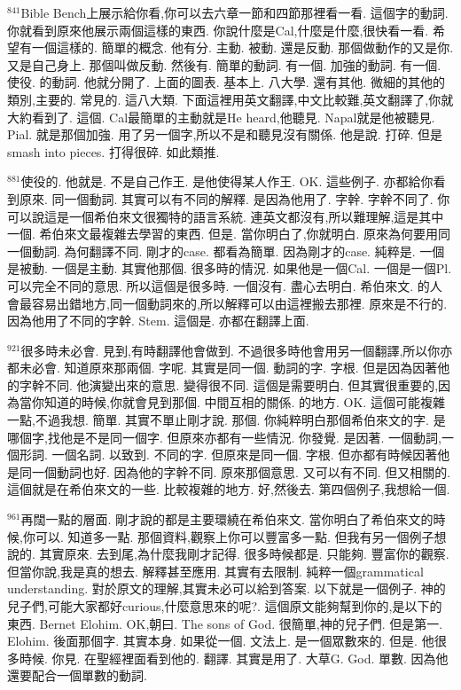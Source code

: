 \documentclass{book}
\begin{document}
$^{841}$Bible Bench上展示給你看,你可以去六章一節和四節那裡看一看.
這個字的動詞.
你就看到原來他展示兩個這樣的東西.
你說什麼是Cal,什麼是什麼,很快看一看.
希望有一個這樣的.
簡單的概念.
他有分.
主動.
被動.
還是反動.
那個做動作的又是你.
又是自己身上.
那個叫做反動.
然後有.
簡單的動詞.
有一個.
加強的動詞.
有一個.
使役.
的動詞.
他就分開了.
上面的圖表.
基本上.
八大學.
還有其他.
微細的其他的類別,主要的.
常見的.
這八大類.
下面這裡用英文翻譯,中文比較難,英文翻譯了,你就大約看到了.
這個.
Cal最簡單的主動就是He heard,他聽見.
Napal就是他被聽見.
Pial.
就是那個加強.
用了另一個字,所以不是和聽見沒有關係.
他是說.
打碎.
但是smash into pieces.
打得很碎.
如此類推.

$^{881}$使役的.
他就是.
不是自己作王.
是他使得某人作王.
OK.
這些例子.
亦都給你看到原來.
同一個動詞.
其實可以有不同的解釋.
是因為他用了.
字幹.
字幹不同了.
你可以說這是一個希伯來文很獨特的語言系統.
連英文都沒有,所以難理解,這是其中一個.
希伯來文最複雜去學習的東西.
但是.
當你明白了,你就明白.
原來為何要用同一個動詞.
為何翻譯不同.
剛才的case.
都看為簡單.
因為剛才的case.
純粹是.
一個是被動.
一個是主動.
其實他那個.
很多時的情況.
如果他是一個Cal.
一個是一個Pl.
可以完全不同的意思.
所以這個是很多時.
一個沒有.
盡心去明白.
希伯來文.
的人會最容易出錯地方,同一個動詞來的,所以解釋可以由這裡搬去那裡.
原來是不行的.
因為他用了不同的字幹.
Stem.
這個是.
亦都在翻譯上面.

$^{921}$很多時未必會.
見到,有時翻譯他會做到.
不過很多時他會用另一個翻譯,所以你亦都未必會.
知道原來那兩個.
字呢.
其實是同一個.
動詞的字.
字根.
但是因為因著他的字幹不同.
他演變出來的意思.
變得很不同.
這個是需要明白.
但其實很重要的,因為當你知道的時候,你就會見到那個.
中間互相的關係.
的地方.
OK.
這個可能複雜一點,不過我想.
簡單.
其實不單止剛才說.
那個.
你純粹明白那個希伯來文的字.
是哪個字,找他是不是同一個字.
但原來亦都有一些情況.
你發覺.
是因著.
一個動詞,一個形詞.
一個名詞.
以致到.
不同的字.
但原來是同一個.
字根.
但亦都有時候因著他是同一個動詞也好.
因為他的字幹不同.
原來那個意思.
又可以有不同.
但又相關的.
這個就是在希伯來文的一些.
比較複雜的地方.
好,然後去.
第四個例子,我想給一個.

$^{961}$再闊一點的層面.
剛才說的都是主要環繞在希伯來文.
當你明白了希伯來文的時候,你可以.
知道多一點.
那個資料,觀察上你可以豐富多一點.
但我有另一個例子想說的.
其實原來.
去到尾,為什麼我剛才記得.
很多時候都是.
只能夠.
豐富你的觀察.
但當你說,我是真的想去.
解釋甚至應用.
其實有去限制.
純粹一個grammatical understanding.
對於原文的理解,其實未必可以給到答案.
以下就是一個例子.
神的兒子們,可能大家都好curious,什麼意思來的呢?.
這個原文能夠幫到你的,是以下的東西.
Bernet Elohim.
OK,朝曰.
The sons of God.
很簡單,神的兒子們.
但是第一.
Elohim.
後面那個字.
其實本身.
如果從一個.
文法上.
是一個眾數來的.
但是.
他很多時候.
你見.
在聖經裡面看到他的.
翻譯.
其實是用了.
大草G.
God.
單數.
因為他還要配合一個單數的動詞.
\end{document}
